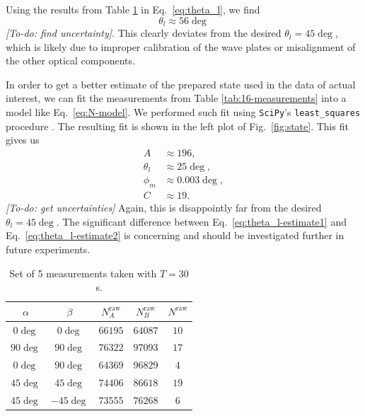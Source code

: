 \documentclass{../paper}
\newcommand{\eq}[1]{Eq.~\eqref{#1}}
\newcommand{\fig}[1]{Fig.~\ref{#1}}
\newcommand{\todo}[1]{{\em [To-do: #1]}}
\begin{document}
Using the results from Table \ref{tab:5-measurements} in \eq{eq:theta_l}, we find
\begin{equation}\label{eq:theta_l-estimate1}
  \theta_l \approx 56\deg
\end{equation}
\todo{find uncertainty}. This clearly deviates from the desired $\theta_l = 45\deg$, which is likely due to improper calibration of the wave plates or misalignment of the other optical components.

In order to get a better estimate of the prepared state used in the data of actual interest, we can fit the measurements from Table \ref{tab:16-measurements} into a model like \eq{eq:N-model}. We performed such fit using {\tt SciPy}'s {\tt least\_squares} procedure \cite{SciPy}. The resulting fit is shown in the left plot of \fig{fig:state}. This fit gives us
\begin{align}
  A &\approx 196, \label{eq:A-estimate} \\
  \theta_l &\approx 25\deg, \label{eq:theta_l-estimate2} \\
  \phi_m &\approx 0.003\deg, \\
  C &\approx 19. \label{eq:C-estimate}
\end{align}
\todo{get uncertainties} Again, this is disappointly far from the desired $\theta_l = 45\deg$. The significant difference between \eq{eq:theta_l-estimate1} and \eq{eq:theta_l-estimate2} is concerning and should be investigated further in future experiments.

\begin{table}
  \centering
  \begin{tabular}{ccccc}
    \hline
    \hline
    $\alpha$ & $\beta$   & $N_A^\text{raw}$ & $N_B^\text{raw}$ & $N^\text{raw}$ \\
    \hline
    $0\deg$  & $0\deg$   & $66195$          & $64087$	         & $10$           \\
    $90\deg$ & $90\deg$  & $76322$          & $97093$	         & $17$           \\
    $0\deg$  & $90\deg$  & $64369$          & $96829$	         & $4$            \\
    $45\deg$ & $45\deg$  & $74406$          & $86618$	         & $19$           \\
    $45\deg$ & $-45\deg$ & $73555$          & $76268$	         & $6$            \\
    \hline
  \end{tabular}
  \caption{Set of 5 measurements taken with $T = 30$ s.}
  \label{tab:5-measurements}
\end{table}
\end{document}

